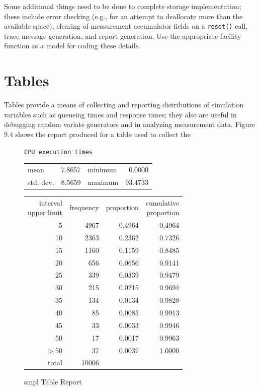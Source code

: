 Some additional things need to be done to complete storage implementation;
these include error checking (e.g., for an attempt to deallocate more
than the available space), clearing of measurement accumulator fields on a
\texttt{reset()} call, trace message generation, and report generation. Use the
appropriate facility function as a model for coding these details.

\section{Tables}

Tables provide a means of collecting and reporting distributions of simulation
variables such as queueing times and response times; they also are
useful in debugging random variate generators and in analyzing measurement
data. Figure 9.4 shows the report produced for a table used to collect the
\begin{figure}[H]
\centering
\small
\texttt{CPU execution times}\par\medskip
\begin{tabular}{lr@{\qquad\qquad}lr}
mean & 7.8657 & minimum & 0.0000 \\
std. dev. & 8.5659 & maximum & 93.4733
\end{tabular}\par\medskip
\begin{tabular}{rrrr}
\shortstack{interval\\upper limit} & frequency & proportion & \shortstack{cumulative\\proportion} \\
5 & 4967 & 0.4964 & 0.4964 \\
10 & 2363 & 0.2362 & 0.7326 \\
15 & 1160 & 0.1159 & 0.8485 \\
20 & 656 & 0.0656 & 0.9141 \\
25 & 339 & 0.0339 & 0.9479 \\
30 & 215 & 0.0215 & 0.9694 \\
35 & 134 & 0.0134 & 0.9828 \\
40 & 85 & 0.0085 & 0.9913 \\
45 & 33 & 0.0033 & 0.9946 \\
50 & 17 & 0.0017 & 0.9963 \\
$>50$ & 37 & 0.0037 & 1.0000 \\
total & 10006 & &
\end{tabular}
\caption{smpl Table Report}
\end{figure}

